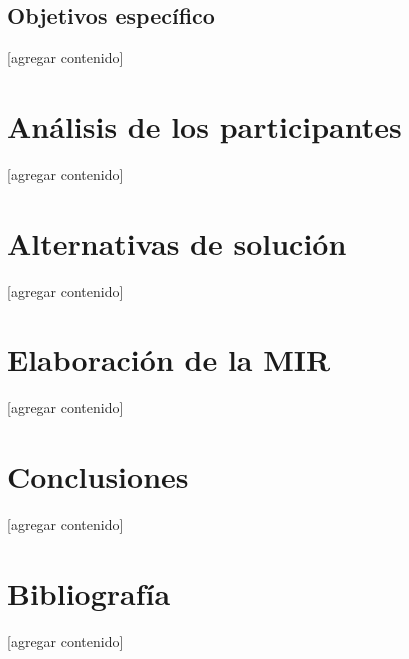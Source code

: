 \documentclass{article}
\begin{document}
\subsection{Objetivos específico}\label{subsec:specific-objs}
[agregar contenido]

\section{Análisis de los participantes}\label{sec:participants}
[agregar contenido]

\section{Alternativas de solución}\label{sec:alternatives}
[agregar contenido]

\section{Elaboración de la MIR}\label{sec:mir}
[agregar contenido]

\section{Conclusiones}\label{sec:conclutions}
[agregar contenido]

\section{Bibliografía}\label{sec:references}
[agregar contenido]
\end{document}
